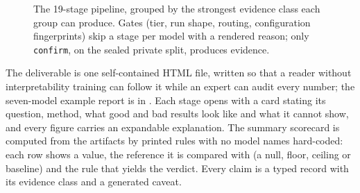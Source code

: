 \begin{figure}[!tb]
\caption{The 19-stage pipeline, grouped by the strongest evidence class each group can produce. Gates
(tier, run shape, routing, configuration fingerprints) skip a stage per model with a rendered reason; only
\texttt{confirm}, on the sealed private split, produces  evidence.}
\label{fig:stages}
\end{figure}

The deliverable is one self-contained HTML file, written so that a reader without interpretability training can follow
it while an expert can audit every number; the seven-model example report is in . Each stage opens with a card stating its question,
method, what good and bad results look like and what it cannot show, and every figure carries an expandable explanation.
The summary scorecard is computed from the artifacts by printed rules with no model names hard-coded: each row shows a
value, the reference it is compared with (a null, floor, ceiling or baseline) and the rule that yields the verdict. Every
claim is a typed record with its evidence class and a generated caveat.


